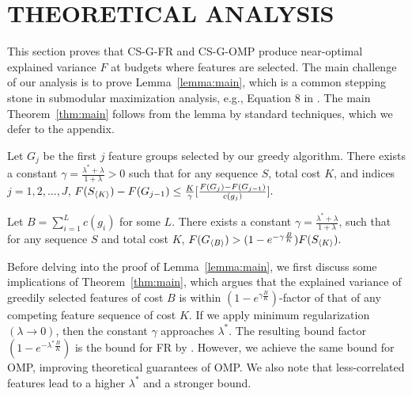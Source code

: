 \section{THEORETICAL ANALYSIS}
\label{sec:gomp_proof}

This section proves that CS-G-FR and CS-G-OMP 
produce near-optimal explained variance $F$ at budgets 
where features are selected. The main challenge of our analysis is to prove Lemma~\ref{lemma:main},
which is a common stepping stone in 
submodular maximization analysis, e.g., Equation 8 in \citep{submodular}. The main Theorem~\ref{thm:main} follows from the lemma by standard techniques, which we defer to the appendix. 

\begin{lemma}[main]
  Let $G_j$ be the first $j$ feature groups selected by our greedy algorithm. There exists a constant $\gamma = \frac{\lambda^* + \lambda}{1 +\lambda} > 0$ such that for any sequence $S$, total cost $K$, and indices $j=1,2,..., J$, 
  \mbox{$
    F(S_{\langle K \rangle}) - F(G_{j-1}) \leq \frac{K}{\gamma}
      \lbrack \frac{F(G_j) - F(G_{j-1})}{c(g_j)} \rbrack.
  $}
  \label{lemma:main}
\end{lemma}


\begin{theorem}
Let $B = \sum _{i=1}^L c(g_i)$ for some $L$.  
There exists a constant  
  $\gamma = \frac{\lambda^* + \lambda}{1+\lambda}$, 
  such that
for any sequence $S$ and total cost $K$, 
\mbox{$
  F(G_{\langle B \rangle}) > (1 - e^{-\gamma\frac{B}{K}})F(S_{\langle K \rangle}).
$}
\label{thm:main}
\end{theorem}

%
Before delving into the proof of Lemma~\ref{lemma:main}, we first discuss 
some implications of Theorem~\ref{thm:main}, which 
argues that the explained variance of greedily selected
features of cost $B$ is within $(1-e^{\gamma \frac{B}{K}})$-factor
of that of any competing feature sequence of cost $K$.
If we apply minimum regularization $(\lambda \rightarrow 0)$, then 
the constant $\gamma$ approaches $\lambda^*$. The resulting bound factor $(1-e^{ - \lambda^* \frac{B}{K}})$ is the bound for FR by \cite{kemp}. However, we achieve the same bound for OMP, improving
theoretical guarantees of OMP. We also note that less-correlated features lead
to a higher $\lambda^*$  and a stronger bound. 


